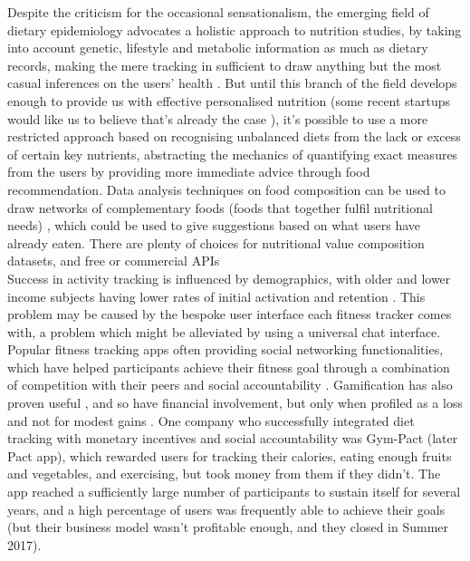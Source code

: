 Despite the criticism for the occasional sensationalism, the emerging field of dietary epidemiology advocates a holistic approach to nutrition studies, by taking into account genetic, lifestyle and metabolic information as much as dietary records, making the mere tracking in sufficient to draw anything but the most casual inferences on the users' health \cite{byers2001food}. But until this branch of the field develops enough to provide us with effective personalised nutrition (some recent startups would like us to believe that's already the case \cite{habitwebsite}), it's possible to use a more restricted approach based on recognising unbalanced diets from the lack or excess of certain key nutrients, abstracting the mechanics of quantifying exact measures from the users by providing more immediate advice through food recommendation. Data analysis techniques on food composition can be used to draw networks of complementary foods (foods that together fulfil nutritional needs) \cite{Kim2015a}, which could be used to give suggestions based on what users have already eaten. There are plenty of choices for nutritional value composition datasets\cite{usda}, and free or commercial APIs \cite{foodapis}\\
Success in activity tracking is influenced by demographics, with older and lower income subjects having lower rates of initial activation and retention \cite{Patel2017}. This problem may be caused by the bespoke user interface each fitness tracker comes with, a problem which might be alleviated by using a universal chat interface.\\
Popular fitness tracking apps often providing social networking functionalities, which have helped participants achieve their fitness goal through a combination of competition with their peers and social accountability \cite{chenchen2014}. Gamification has also proven useful \cite{doi:10.1001/jamainternmed.2017.3458}, and so have financial involvement, but only when profiled as a loss and not for modest gains \cite{doi:10.7326/M15-1635}. One company who successfully integrated diet tracking with monetary incentives and social accountability was Gym-Pact (later Pact app), which rewarded users for tracking their calories, eating enough fruits and vegetables, and exercising, but took money from them if they didn't. The app reached a sufficiently large number of participants \cite{nudgingpracticioner} to sustain itself for several years, and a high percentage of users was frequently able to achieve their goals (but their business model wasn't profitable enough, and they closed in Summer 2017).
